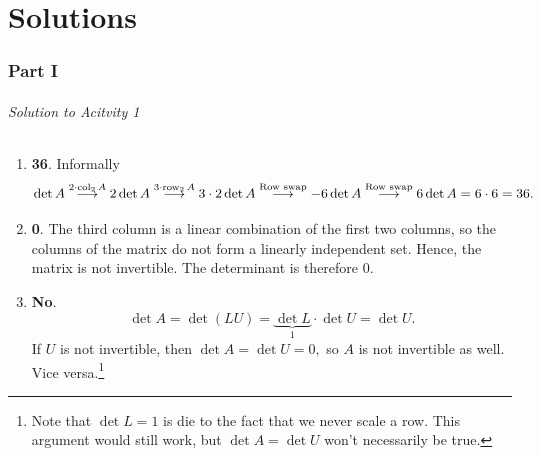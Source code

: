 \part{Solutions}

\section{Part I}
\paragraph{Solution to Acitvity 1}

\begin{enumerate}
	\item \textbf{36}. Informally 
		\[\det A \overset{2 \cdot \operatorname{col}_2 A}{\longrightarrow} 2\det A \overset{3 \cdot \operatorname{row}_2 A}{\longrightarrow} 3 \cdot 2 \det A 
		   \overset{\text{Row swap}}{\longrightarrow} -6\det A \overset{\text{Row swap}}{\longrightarrow}6 \det A = 6 \cdot 6 = 36.\]

	\item \textbf{0}. The third column is a linear combination of the first two columns, so the columns of the matrix do not form a linearly independent set. Hence,
		the matrix is not invertible. The determinant is therefore 0.
	
	\item \textbf{No}. \[\det A = \det(LU) = \underbrace{\det L}_{1} \cdot \det U = \det U.\] If \(U\) is not invertible, then \(\det A = \det U = 0,\) so \(A\) is not
		invertible as well. Vice versa.\footnote{Note that \(\det L = 1\) is die to the fact that we never scale a row. This argument would still work, but 
		\(\det A = \det U\) won't necessarily be true.}


\end{enumerate}
